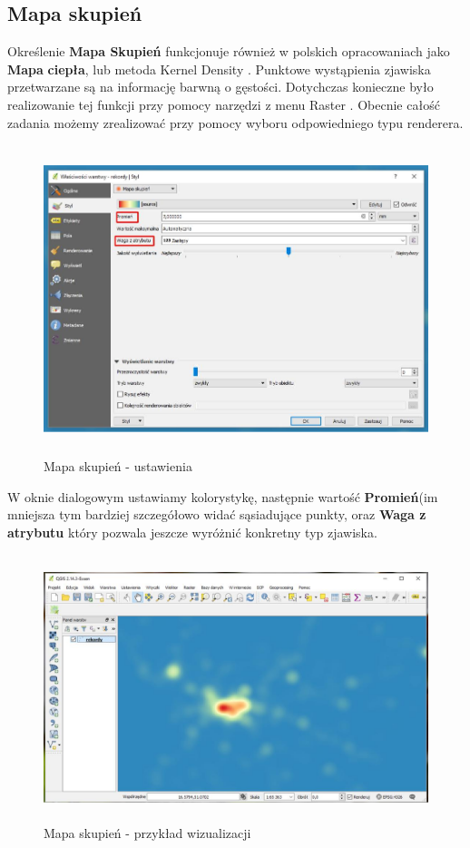 \documentclass[12pt,a4paper]{book}
\begin{document}
\subsection{Mapa skupień}
Określenie \textbf{Mapa Skupień} funkcjonuje również w polskich opracowaniach jako \textbf{Mapa} \textbf{ciepła}, lub metoda Kernel Density \cite{ESRI}. Punktowe wystąpienia zjawiska przetwarzane są na informację barwną o gęstości. Dotychczas konieczne było realizowanie tej funkcji przy pomocy narzędzi z menu  Raster . Obecnie całość zadania możemy zrealizować przy pomocy wyboru odpowiedniego typu renderera.


\begin{center}
\begin{figure}
\includegraphics[width=13cm,height=9.006cm]{007-heatmap-u.jpg}
\caption{Mapa skupień - ustawienia}
\end{figure}
\end{center}
W oknie dialogowym ustawiamy kolorystykę, następnie wartość \textbf{Promień}(im mniejsza tym bardziej szczegółowo widać sąsiadujące punkty, oraz \textbf{Waga z atrybutu} który pozwala jeszcze wyróżnić konkretny typ zjawiska.


\begin{center}
\begin{figure}
\includegraphics[width=13cm,height=7.747cm]{007-heatmap-w.jpg}
\caption{Mapa skupień - przykład wizualizacji}
\end{figure}
\end{center}
\end{document}
